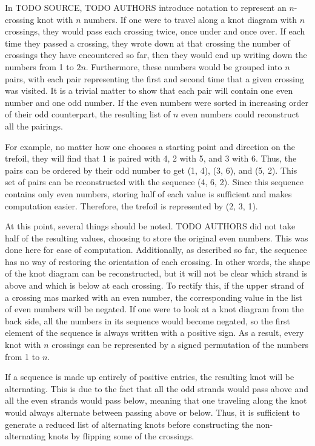 \begin{paper}

In TODO SOURCE, TODO AUTHORS introduce notation to represent an $n$-crossing
knot with $n$ numbers.
If one were to travel along a knot diagram with $n$ crossings, they would pass
each crossing twice, once under and once over.
If each time they passed a crossing, they wrote down at that crossing the number
of crossings they have encountered so far, then they would end up writing down
the numbers from 1 to $2n$.
Furthermore, these numbers would be grouped into $n$ pairs, with each pair
representing the first and second time that a given crossing was visited.
It is a trivial matter to show that each pair will contain one even number and
one odd number.
If the even numbers were sorted in increasing order of their odd counterpart,
the resulting list of $n$ even numbers could reconstruct all the pairings.

For example, no matter how one chooses a starting point and direction on the
trefoil, they will find that 1 is paired with 4, 2 with 5, and 3 with 6.
Thus, the pairs can be ordered by their odd number to get (1, 4), (3, 6), and
(5, 2).
This set of pairs can be reconstructed with the sequence (4, 6, 2).
Since this sequence contains only even numbers, storing half of each value is
sufficient and makes computation easier.
Therefore, the trefoil is represented by (2, 3, 1).

At this point, several things should be noted.
TODO AUTHORS did not take half of the resulting values, choosing to store the
original even numbers.
This was done here for ease of computation.
Additionally, as described so far, the sequence has no way of restoring the
orientation of each crossing.
In other words, the shape of the knot diagram can be reconstructed, but it will
not be clear which strand is above and which is below at each crossing.
To rectify this, if the upper strand of a crossing mas marked with an even
number, the corresponding value in the list of even numbers will be negated.
If one were to look at a knot diagram from the back side, all the numbers in its
sequence would become negated, so the first element of the sequence is always
written with a positive sign.
As a result, every knot with $n$ crossings can be represented by a signed
permutation of the numbers from 1 to $n$.


If a sequence is made up entirely of positive entries, the resulting knot will
be alternating.
This is due to the fact that all the odd strands would pass above and all the
even strands would pass below, meaning that one traveling along the knot would
always alternate between passing above or below.
Thus, it is sufficient to generate a reduced list of alternating knots before
constructing the non-alternating knots by flipping some of the crossings.


\end{paper}
